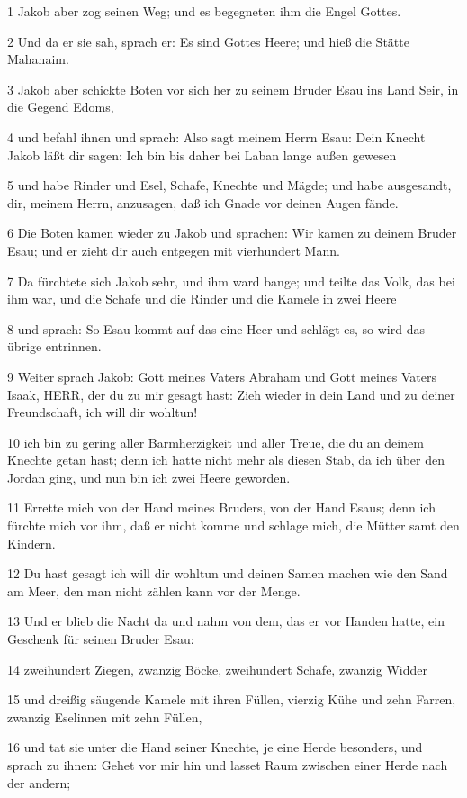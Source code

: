 \par 1 Jakob aber zog seinen Weg; und es begegneten ihm die Engel Gottes.
\par 2 Und da er sie sah, sprach er: Es sind Gottes Heere; und hieß die Stätte Mahanaim.
\par 3 Jakob aber schickte Boten vor sich her zu seinem Bruder Esau ins Land Seir, in die Gegend Edoms,
\par 4 und befahl ihnen und sprach: Also sagt meinem Herrn Esau: Dein Knecht Jakob läßt dir sagen: Ich bin bis daher bei Laban lange außen gewesen
\par 5 und habe Rinder und Esel, Schafe, Knechte und Mägde; und habe ausgesandt, dir, meinem Herrn, anzusagen, daß ich Gnade vor deinen Augen fände.
\par 6 Die Boten kamen wieder zu Jakob und sprachen: Wir kamen zu deinem Bruder Esau; und er zieht dir auch entgegen mit vierhundert Mann.
\par 7 Da fürchtete sich Jakob sehr, und ihm ward bange; und teilte das Volk, das bei ihm war, und die Schafe und die Rinder und die Kamele in zwei Heere
\par 8 und sprach: So Esau kommt auf das eine Heer und schlägt es, so wird das übrige entrinnen.
\par 9 Weiter sprach Jakob: Gott meines Vaters Abraham und Gott meines Vaters Isaak, HERR, der du zu mir gesagt hast: Zieh wieder in dein Land und zu deiner Freundschaft, ich will dir wohltun!
\par 10 ich bin zu gering aller Barmherzigkeit und aller Treue, die du an deinem Knechte getan hast; denn ich hatte nicht mehr als diesen Stab, da ich über den Jordan ging, und nun bin ich zwei Heere geworden.
\par 11 Errette mich von der Hand meines Bruders, von der Hand Esaus; denn ich fürchte mich vor ihm, daß er nicht komme und schlage mich, die Mütter samt den Kindern.
\par 12 Du hast gesagt ich will dir wohltun und deinen Samen machen wie den Sand am Meer, den man nicht zählen kann vor der Menge.
\par 13 Und er blieb die Nacht da und nahm von dem, das er vor Handen hatte, ein Geschenk für seinen Bruder Esau:
\par 14 zweihundert Ziegen, zwanzig Böcke, zweihundert Schafe, zwanzig Widder
\par 15 und dreißig säugende Kamele mit ihren Füllen, vierzig Kühe und zehn Farren, zwanzig Eselinnen mit zehn Füllen,
\par 16 und tat sie unter die Hand seiner Knechte, je eine Herde besonders, und sprach zu ihnen: Gehet vor mir hin und lasset Raum zwischen einer Herde nach der andern;
